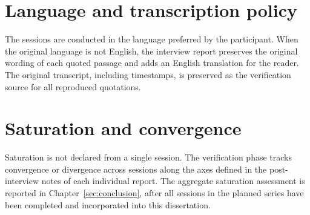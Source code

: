 \section*{Language and transcription policy}

The sessions are conducted in the language preferred by the participant. When the original language is not English, the interview report preserves the original wording of each quoted passage and adds an English translation for the reader. The original transcript, including timestamps, is preserved as the verification source for all reproduced quotations.

\section*{Saturation and convergence}

Saturation is not declared from a single session. The verification phase tracks convergence or divergence across sessions along the axes defined in the post-interview notes of each individual report. The aggregate saturation assessment is reported in Chapter~\ref{sec:conclusion}, after all sessions in the planned series have been completed and incorporated into this dissertation.
